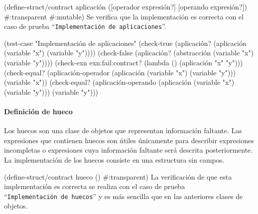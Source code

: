 \documentclass[10pt,oneside,openany,letterpaper]{book}
\begin{document}
\nwenddocs{}\endmoddef
(define-struct/contract aplicación
  ([operador expresión?] [operando expresión?])
  #:transparent
  #:mutable)
\eatline
{}\nwendcode{}\nwdocspar
Se verifica que la implementación es correcta con el caso de prueba ``{\tt{}Implementación\ de\ aplicaciones}''.

\nwenddocs{}\plusendmoddef
(test-case "Implementación de aplicaciones"  
  (check-true (aplicación? (aplicación (variable "x") (variable "y"))))
  (check-false (aplicación? (abstracción (variable "x") (variable "y"))))
  (check-exn exn:fail:contract? (lambda () (aplicación "x" "y")))
  (check-equal? (aplicación-operador (aplicación (variable "x") (variable "y")))
                (variable "x"))
  (check-equal? (aplicación-operando (aplicación (variable "x") (variable "y")))
                (variable "y")))
\nwendcode{}\nwdocspar

\paragraph{Definición de hueco} Los huecos son una clase de objetos que representan información faltante. Las expresiones que contienen huecos son útiles únicamente para describir expresiones incompletas o expresiones cuya información faltante será descrita posteriormente. La implementación de los huecos consiste en una estructura sin campos.

\nwenddocs{}\endmoddef
(define-struct/contract hueco
  ()
  #:transparent)
\eatline
{}\nwendcode{}\nwdocspar
La verificación de que esta implementación es correcta se realiza con el caso de prueba ``{\tt{}Implementación\ de\ huecos}'' y es más sencilla que en las anteriores clases de objetos.
\end{document}
